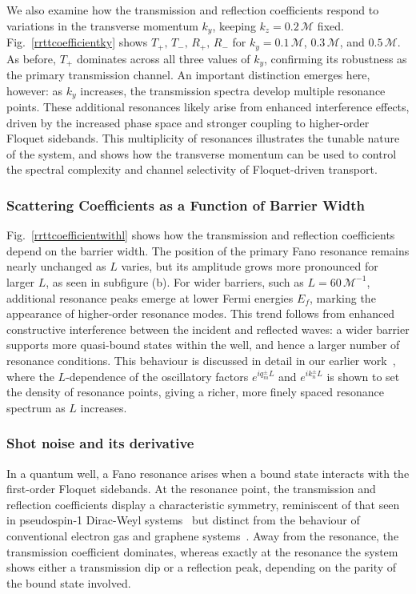 \documentclass[aps,prb,onecolumn,longbibliography,nofootinbib,citeautoscript,10pt]{revtex4-2}
\begin{document}
We also examine how the transmission and reflection coefficients respond to variations in the transverse momentum $k_y$, keeping $k_z=0.2\,\mathcal{M}$ fixed. Fig.~\ref{rrttcoefficientky} shows $T_+,\, T_-,\, R_+,\, R_-$ for $k_y=0.1\,\mathcal{M}$, $0.3\,\mathcal{M}$, and $0.5\,\mathcal{M}$. As before, $T_+$ dominates across all three values of $k_y$, confirming its robustness as the primary transmission channel. An important distinction emerges here, however: as $k_y$ increases, the transmission spectra develop multiple resonance points. These additional resonances likely arise from enhanced interference effects, driven by the increased phase space and stronger coupling to higher-order Floquet sidebands. This multiplicity of resonances illustrates the tunable nature of the system, and shows how the transverse momentum can be used to control the spectral complexity and channel selectivity of Floquet-driven transport.

\subsubsection{Scattering Coefficients as a Function of Barrier Width}

Fig.~\ref{rrttcoefficientwithl} shows how the transmission and reflection coefficients depend on the barrier width. The position of the primary Fano resonance remains nearly unchanged as $L$ varies, but its amplitude grows more pronounced for larger $L$, as seen in subfigure (b). For wider barriers, such as $L=60\,\mathcal{M}^{-1}$, additional resonance peaks emerge at lower Fermi energies $E_f$, marking the appearance of higher-order resonance modes. This trend follows from enhanced constructive interference between the incident and reflected waves: a wider barrier supports more quasi-bound states within the well, and hence a larger number of resonance conditions. This behaviour is discussed in detail in our earlier work~\cite{bera2023},  where the $L$-dependence of the oscillatory factors $e^{iq^{\pm}_m L}$ and $e^{ik^{\pm}_n L}$ is shown to set the density of resonance points, giving a richer, more finely spaced resonance spectrum as $L$ increases.

\subsubsection{Shot noise and its derivative}

In a quantum well, a Fano resonance arises when a bound state interacts with the first-order Floquet sidebands. At the resonance point, the transmission and reflection coefficients display a characteristic symmetry, reminiscent of that seen in pseudospin-1 Dirac-Weyl systems~\cite{Zhu17} but distinct from the behaviour of conventional electron gas and graphene systems~\cite{reichl199,Zhu15}. Away from the resonance, the transmission coefficient dominates, whereas exactly at the resonance the system shows either a transmission dip or a reflection peak, depending on the parity of the bound state involved.
\end{document}
